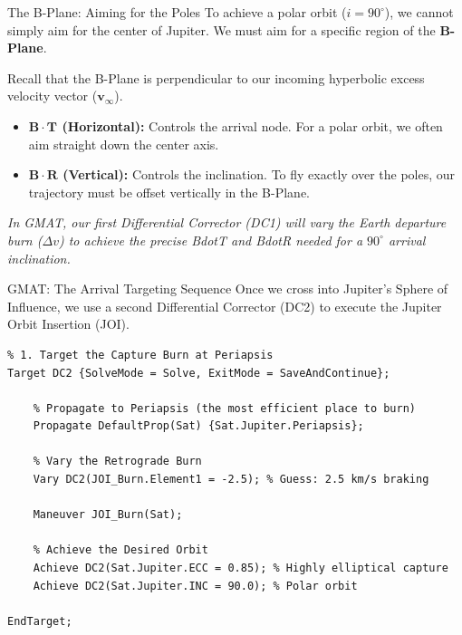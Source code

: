 \documentclass[11pt]{beamer}
\begin{document}
\begin{frame}{The B-Plane: Aiming for the Poles}
    To achieve a polar orbit ($i = 90^\circ$), we cannot simply aim for the center of Jupiter. We must aim for a specific region of the \textbf{B-Plane}.
    
    \vspace{0.3cm}
    Recall that the B-Plane is perpendicular to our incoming hyperbolic excess velocity vector ($\bm{v}_\infty$).
    \begin{itemize}
        \item \textbf{$\bm{B} \cdot \bm{T}$ (Horizontal):} Controls the arrival node. For a polar orbit, we often aim straight down the center axis.
        \item \textbf{$\bm{B} \cdot \bm{R}$ (Vertical):} Controls the inclination. To fly exactly over the poles, our trajectory must be offset vertically in the B-Plane.
    \end{itemize}
    
    \vspace{0.2cm}
    \textit{In GMAT, our first Differential Corrector (DC1) will vary the Earth departure burn ($\Delta v$) to achieve the precise BdotT and BdotR needed for a $90^\circ$ arrival inclination.}
\end{frame}

\begin{frame}[fragile]{GMAT: The Arrival Targeting Sequence}
    Once we cross into Jupiter's Sphere of Influence, we use a second Differential Corrector (DC2) to execute the Jupiter Orbit Insertion (JOI).
    
\begin{lstlisting}
% 1. Target the Capture Burn at Periapsis
Target DC2 {SolveMode = Solve, ExitMode = SaveAndContinue};
    
    % Propagate to Periapsis (the most efficient place to burn)
    Propagate DefaultProp(Sat) {Sat.Jupiter.Periapsis};
    
    % Vary the Retrograde Burn
    Vary DC2(JOI_Burn.Element1 = -2.5); % Guess: 2.5 km/s braking
    
    Maneuver JOI_Burn(Sat);
    
    % Achieve the Desired Orbit 
    Achieve DC2(Sat.Jupiter.ECC = 0.85); % Highly elliptical capture
    Achieve DC2(Sat.Jupiter.INC = 90.0); % Polar orbit
    
EndTarget;
\end{lstlisting}
\end{frame}
\end{document}
